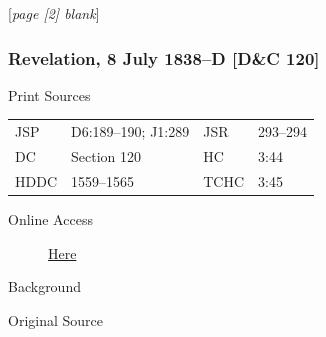 					[\textit{page [2] blank}]
					
		\subsubsection{Revelation, 8 July 1838--D [D\&C 120]}
			\label{EMS-1838-JS-8-JUL-1838-D}
			
			\begin{description}
					\item[Print Sources]
				\end{description}

					\begin{tabular}{p{0.5in}p{1in}p{0.5in}p{1in}}
					JSP	 	& D6:189--190; J1:289				& JSR 		& 293--294 \\
					DC	 	& Section 120		& HC 		& 3:44 \\
					HDDC 	& 1559--1565		& TCHC 		& 3:45 \\
					\end{tabular}
				
				\begin{description}
					\item[Online Access] \href{https://www.josephsmithpapers.org/paper-summary/revelation-8-july-1838-d-dc-120/1}{Here}
				\end{description}
				
				\begin{description}
					\item[Background]
				\end{description}
				
				
				\begin{description}
					\item[Original Source]
				\end{description}
				
				
